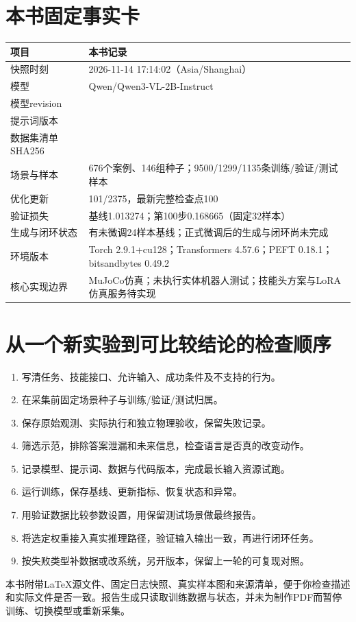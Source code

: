 \section{本书固定事实卡}
\begin{longtable}{P{52mm}P{99mm}}
\toprule
项目 & 本书记录\\
\midrule
\endhead
快照时刻 & 2026-11-14 17:14:02（Asia/Shanghai）\\
模型 & Qwen/Qwen3-VL-2B-Instruct\\
模型revision & \\
提示词版本 & \\
数据集清单SHA256 & \\
场景与样本 & 676个案例、146组种子；9500/1299/1135条训练/验证/测试样本\\
优化更新 & 101/2375，最新完整检查点100\\
验证损失 & 基线1.013274；第100步0.168665（固定32样本）\\
生成与闭环状态 & 有未微调24样本基线；正式微调后的生成与闭环尚未完成\\
环境版本 & Torch 2.9.1+cu128；Transformers 4.57.6；PEFT 0.18.1；bitsandbytes 0.49.2\\
核心实现边界 & MuJoCo仿真；未执行实体机器人测试；技能头方案与LoRA仿真服务待实现\\
\bottomrule
\end{longtable}

\section{从一个新实验到可比较结论的检查顺序}
\begin{enumerate}
\item 写清任务、技能接口、允许输入、成功条件及不支持的行为。
\item 在采集前固定场景种子与训练/验证/测试归属。
\item 保存原始观测、实际执行和独立物理验收，保留失败记录。
\item 筛选示范，排除答案泄漏和未来信息，检查语言是否真的改变动作。
\item 记录模型、提示词、数据与代码版本，完成最长输入资源试跑。
\item 运行训练，保存基线、更新指标、恢复状态和异常。
\item 用验证数据比较参数设置，用保留测试场景做最终报告。
\item 将选定权重接入真实推理路径，验证输入输出一致，再进行闭环任务。
\item 按失败类型补数据或改系统，另开版本，保留上一轮的可复现对照。
\end{enumerate}

本书附带LaTeX源文件、固定日志快照、真实样本图和来源清单，便于你检查描述和实际文件是否一致。报告生成只读取训练数据与状态，并未为制作PDF而暂停训练、切换模型或重新采集。
